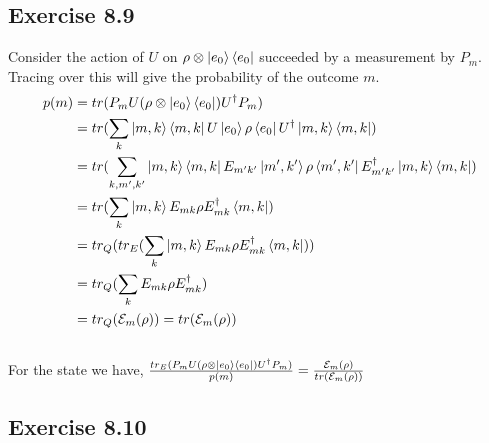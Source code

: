 \documentclass[a4paper,12pt]{article}
\begin{document}
\subsection*{Exercise 8.9}
Consider the action of $U$ on $\rho\otimes \ket{e_0}\bra{e_0}$ succeeded by a measurement by $P_m$.
Tracing over this will give the probability of the outcome $m$.\\
\begin{align*}
    p(m)&=tr(P_m U(\rho\otimes \ket{e_0}\bra{e_0})U^\dagger P_m)\\
&=tr(\displaystyle \sum_k \ket{m,k}\bra{m,k}U\ket{e_0}\rho\bra{e_0}U^\dagger \ket{m,k}\bra{m,k})\\
&=tr(\displaystyle \sum_{k,m^\prime,k^\prime} \ket{m,k}\bra{m,k}E_{m^\prime k^\prime}\ket{m^\prime, k^\prime}
\rho\bra{m^\prime, k^\prime}E_{m^\prime k^\prime}^\dagger \ket{m,k}\bra{m,k})\\
&=tr(\displaystyle \sum_{k} \ket{m,k}E_{m k}
\rho E_{mk}^\dagger\bra{m,k})\\
&=tr_Q(tr_E(\displaystyle \sum_{k} \ket{m,k}E_{mk}
\rho E_{mk}^\dagger\bra{m,k}))\\
&=tr_Q(\displaystyle \sum_{k} E_{mk}
\rho E_{mk}^\dagger)\\
&=tr_Q(\mathcal{E}_m(\rho))=tr(\mathcal{E}_m(\rho))
\end{align*}\\

For the state we have,
$\frac{tr_E(P_m U(\rho\otimes \ket{e_0}\bra{e_0})U^\dagger P_m)}{p(m)}=\frac{\mathcal{E}_m(\rho)}{tr(\mathcal{E}_m(\rho))}$
\subsection*{Exercise 8.10}
\end{document}
